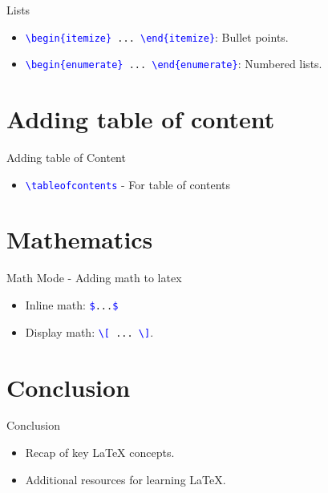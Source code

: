 \documentclass{beamer}
\begin{document}
	\begin{frame}{Lists}
		\begin{itemize}
			\item \texttt{\textcolor{blue}{\textbackslash begin\{itemize\}} ... \textcolor{blue}{\textbackslash end\{itemize\}}}: Bullet points.
			
			\item \texttt{\textcolor{blue}{\textbackslash begin\{enumerate\}} ... \textcolor{blue}{\textbackslash end\{enumerate\}}}: Numbered lists.
		\end{itemize}
	\end{frame}
	
	\section{Adding table of content}
	
	\begin{frame}{Adding table of Content}
		\begin{itemize}
			\item \texttt{\textcolor{blue}{\textbackslash tableofcontents}} - For table of contents
		\end{itemize}
	\end{frame}
	
	 \section{Mathematics}
	
	 \begin{frame}{Math Mode - Adding math to latex}
		 \begin{itemize}
			 \item Inline math: \texttt{\textcolor{blue}{\$}...\textcolor{blue}{\$}}
			
			\item Display math: \texttt{\textcolor{blue}{\textbackslash[} ... \textcolor{blue}{\textbackslash]}}. 	
		 \end{itemize}
	 \end{frame}
	
	\section{Conclusion}

	\begin{frame}{Conclusion}
		\begin{itemize}
			\item Recap of key LaTeX concepts.
			
			\item Additional resources for learning LaTeX.
		\end{itemize}
	\end{frame}
	
\end{document}

